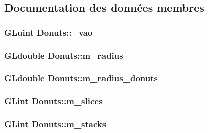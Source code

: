 \subsection{Documentation des données membres}
\hypertarget{class_donuts_a659c70b043ddc2ebcdc64bcb58c1e621}{
\subsubsection[{\+\_\+vao}]{\setlength{\rightskip}{0pt plus 5cm}G\+Luint Donuts\+::\+\_\+vao\hspace{0.3cm}{\ttfamily [private]}}}\label{class_donuts_a659c70b043ddc2ebcdc64bcb58c1e621}
\hypertarget{class_donuts_ae3db8d4ea17228ed43d388bac7fb35b3}{
\subsubsection[{m\+\_\+radius}]{\setlength{\rightskip}{0pt plus 5cm}G\+Ldouble Donuts\+::m\+\_\+radius\hspace{0.3cm}{\ttfamily [private]}}}\label{class_donuts_ae3db8d4ea17228ed43d388bac7fb35b3}
\hypertarget{class_donuts_a5050c790a74b5313a06b818a7f3e8723}{
\subsubsection[{m\+\_\+radius\+\_\+donuts}]{\setlength{\rightskip}{0pt plus 5cm}G\+Ldouble Donuts\+::m\+\_\+radius\+\_\+donuts\hspace{0.3cm}{\ttfamily [private]}}}\label{class_donuts_a5050c790a74b5313a06b818a7f3e8723}
\hypertarget{class_donuts_a2214ac47effb92c5de33fa7c57d28694}{
\subsubsection[{m\+\_\+slices}]{\setlength{\rightskip}{0pt plus 5cm}G\+Lint Donuts\+::m\+\_\+slices\hspace{0.3cm}{\ttfamily [private]}}}\label{class_donuts_a2214ac47effb92c5de33fa7c57d28694}
\hypertarget{class_donuts_a5273bc3a4bdada5e4302b35d49bdd550}{
\subsubsection[{m\+\_\+stacks}]{\setlength{\rightskip}{0pt plus 5cm}G\+Lint Donuts\+::m\+\_\+stacks\hspace{0.3cm}{\ttfamily [private]}}}\label{class_donuts_a5273bc3a4bdada5e4302b35d49bdd550}
